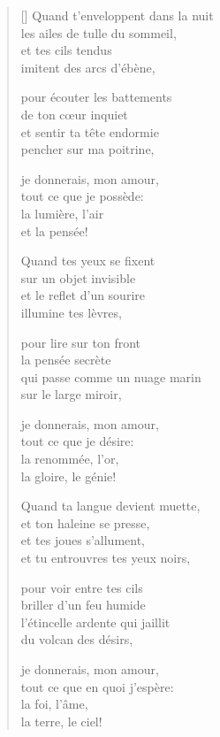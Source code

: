 \documentclass[a4paper,12pt]{book}
\begin{document}
\begin{verse}[\versewidth]
  Quand t'enveloppent dans la nuit \\
  les ailes de tulle du sommeil, \\
  et tes cils tendus \\
  imitent des arcs d'ébène,

  pour écouter les battements \\
  de ton cœur inquiet \\
  et sentir ta tête endormie \\
  pencher sur ma poitrine,

  je donnerais, mon amour, \\
  tout ce que je possède: \\
  la lumière, l'air \\
  et la pensée!

  Quand tes yeux se fixent \\
  sur un objet invisible \\
  et le reflet d'un sourire \\
  illumine tes lèvres,

  pour lire sur ton front \\
  la pensée secrète \\
  qui passe comme un nuage marin \\
  sur le large miroir,

  je donnerais, mon amour, \\
  tout ce que je désire: \\
  la renommée, l'or, \\
  la gloire, le génie!

  Quand ta langue devient muette, \\
  et ton haleine se presse, \\
  et tes joues s'allument, \\
  et tu entrouvres tes yeux noirs,

  pour voir entre tes cils \\
  briller d'un feu humide \\
  l'étincelle ardente qui jaillit \\
  du volcan des désirs,

  je donnerais, mon amour, \\
  tout ce que en quoi j'espère: \\
  la foi, l'âme, \\
  la terre, le ciel!
\end{verse}

\bigskip
\end{document}
